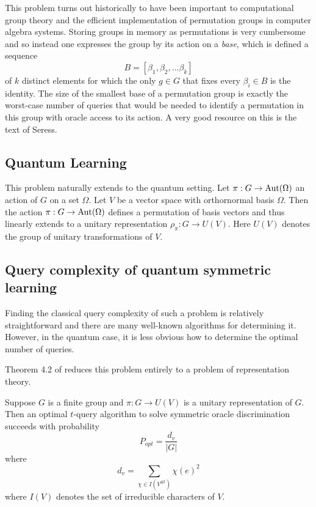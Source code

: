 \bigskip

This problem turns out historically to have been important to computational group theory and the efficient 
implementation of permutation groups in computer algebra systems. Storing groups in memory as permutations is very 
cumbersome and so instead one expresses the group by its action on a \emph{base}, which is defined a sequence
\[
    B = [\beta_1, \beta_2, ... \beta_k]
\]
of $k$ distinct elements for which the only $g\in G$ that fixes every $\beta_i \in B$ is the identity. The size of 
the smallest base of a permutation group is exactly the worst-case number of queries that would be needed to 
identify a permutation in this group with oracle access to its action. A very good resource on this is the text 
\cite{seress} of Seress. 


\subsection{Quantum Learning}

This problem naturally extends to the quantum setting. Let $\pi : G \rightarrow \operatorname{Aut}(\Omega)$ an action of $G$ on a 
set $\Omega$. Let $V$ be a vector space with orthornormal basis $\Omega$. Then the action $\pi : G \rightarrow 
\operatorname{Aut}(\Omega)$ defines a permutation of basis vectors and thus linearly extends to a unitary representation 
$\rho_\pi : G \rightarrow U(V)$. Here $U(V)$ denotes the group of unitary transformations of $V$.




\subsection{Query complexity of quantum symmetric learning}
Finding the classical query complexity of such a problem is relatively straightforward and there are many 
well-known algorithms for determining it. However, in the quantum case, it is less obvious how to determine the 
optimal number of queries.

Theorem 4.2 of \cite{jamie} reduces this problem entirely to a problem of representation theory.
    
\begin{theorem}
    Suppose $G$ is a finite group and $\pi : G \rightarrow U(V)$ is a unitary representation of $G$. Then an 
    optimal $t$-query algorithm to solve symmetric oracle discrimination succeeds with probability
    \[
        P_{opt} = \frac{d_v}{|G|}
    \]
    where
    \[
        d_v = \sum_{\chi \in I(V^{\otimes t})} \chi(e)^2
    \]
    where $I(V)$ denotes the set of irreducible characters of $V$.
\end{theorem}

